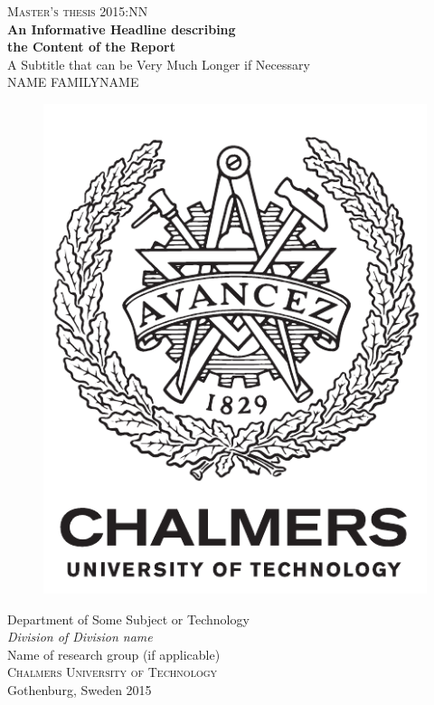 \newpage
\restoregeometry
\thispagestyle{empty}
\mbox{}


\newpage
\thispagestyle{empty}
\begin{center}
	\textsc{\large Master's thesis 2015:NN}\\[4cm]
	\textbf{\Large An Informative Headline describing\\ the Content of the Report} \\[1cm]
	{\large A Subtitle that can be Very Much Longer if Necessary}\\[1cm]
	{\large NAME FAMILYNAME}
	
	\vfill	
	\begin{figure}[h!]
	\centering
	\includegraphics[width=0.2\pdfpagewidth]{figure/auxiliary/logo_eng.pdf} \\	
	\end{figure}	\vspace{5mm}	
	
	Department of Some Subject or Technology \\
	\emph{Division of Division name}\\
	Name of research group (if applicable)\\
	\textsc{Chalmers University of Technology} \\
	Gothenburg, Sweden 2015 \\
\end{center}


